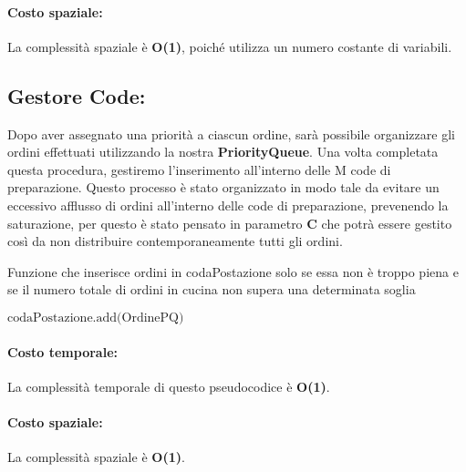 \paragraph{Costo spaziale:}
La complessità spaziale è \textbf{O(1)}, poiché utilizza un numero costante di variabili.

\subsection{Gestore Code:}
Dopo aver assegnato una priorità a ciascun ordine, sarà possibile organizzare gli ordini effettuati utilizzando la nostra \textbf{PriorityQueue}. Una volta completata questa procedura, gestiremo l'inserimento all'interno delle M code di preparazione. Questo processo è stato organizzato in modo tale da evitare un eccessivo afflusso di ordini all'interno delle code di preparazione, prevenendo la saturazione, per questo è stato pensato in parametro \textbf{C} che potrà essere gestito così da non distribuire contemporaneamente tutti gli ordini.

\begin{algorithm}[h]
	\begin{algorithmic}[h!]
		\caption{Funzione che inserisce ordini in codaPostazione solo se essa non è troppo piena e se il numero totale di ordini in cucina non supera una determinata soglia}
		\State $\text{codaPostazione.add(OrdinePQ)}$
		\EndIf
		\EndProcedure
	\end{algorithmic}
\end{algorithm}

\paragraph{Costo temporale:}
La complessità temporale di questo pseudocodice è \textbf{O(1)}.

\paragraph{Costo spaziale:}
La complessità spaziale è \textbf{O(1)}.
\clearpage